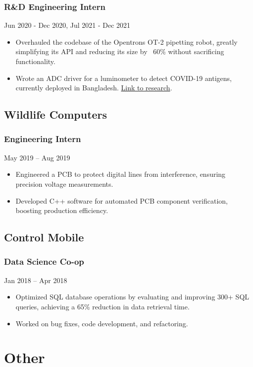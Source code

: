 \documentclass[a4paper, 10pt]{article}
\begin{document}
\subsubsection*{R\&D Engineering Intern}
Jun 2020 - Dec 2020, Jul 2021 - Dec 2021
\begin{itemize}
    \item Overhauled the codebase of the Opentrons OT-2 pipetting robot, greatly simplifying its API and reducing its size by ~60\% without sacrificing functionality.
    \item Wrote an ADC driver for a luminometer to detect COVID-19 antigens, currently deployed in Bangladesh. \href{https://www.medrxiv.org/content/10.1101/2023.05.18.23290120v1}{Link to research}.
\end{itemize}

\subsection*{Wildlife Computers}
\subsubsection*{Engineering Intern}
May 2019 – Aug 2019
\begin{itemize}
    \item Engineered a PCB to protect digital lines from interference, ensuring precision voltage measurements.
    \item Developed C++ software for automated PCB component verification, boosting production efficiency.
\end{itemize}

\subsection*{Control Mobile}
\subsubsection*{Data Science Co-op}
Jan 2018 – Apr 2018
\begin{itemize}
    \item Optimized SQL database operations by evaluating and improving 300+ SQL queries, achieving a 65\% reduction in data retrieval time.
    \item Worked on bug fixes, code development, and refactoring.
\end{itemize}

\section*{Other}
\end{document}
